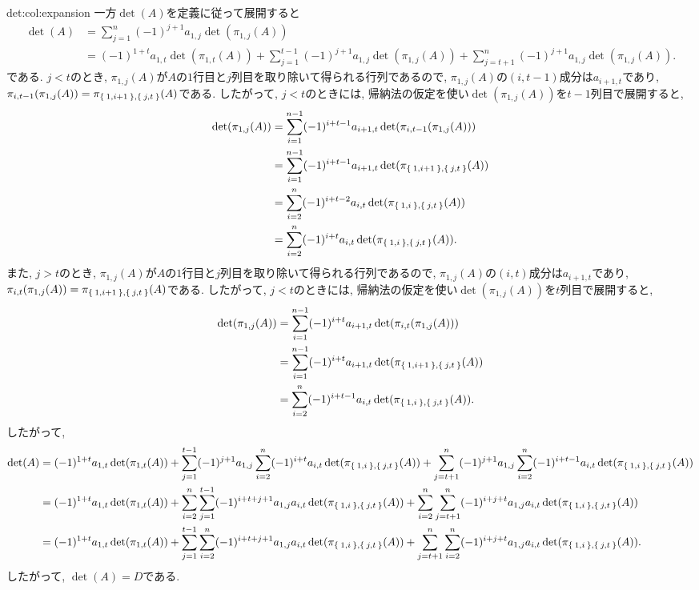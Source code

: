 \begin{proofof}{det:col:expansion}
  一方$\det(A)$を定義に従って展開すると
  \begin{align*}
    \det(A)
    &=\sum_{j=1}^{n}
      (-1)^{j+1}a_{1,j}\det(\pi_{1,j}(A))\\
    &=
    (-1)^{1+t}a_{1,t}\det(\pi_{1,t}(A))
    +\sum_{j=1}^{t-1}(-1)^{j+1}a_{1,j}\det(\pi_{1,j}(A))
    +\sum_{j=t+1}^{n}(-1)^{j+1}a_{1,j}\det(\pi_{1,j}(A)).
  \end{align*}
  である.
  $j<t$のとき,
  $\pi_{1,j}(A)$が$A$の$1$行目と$j$列目を取り除いて得られる行列であるので,
  $\pi_{1,j}(A)$の$(i,t-1)$成分は$a_{i+1,t}$であり,
  $\pi_{i,t-1}(\pi_{1,j}(A))=\pi_{\Set{1,i+1},\Set{j,t}}(A)$である.
  したがって, $j<t$のときには,
  帰納法の仮定を使い$\det(\pi_{1,j}(A))$を$t-1$列目で展開すると,
  \begin{align*}
    \det(\pi_{1,j}(A))
    &=
    \sum_{i=1}^{n-1}
    (-1)^{i+t-1}a_{i+1,t}\det(\pi_{i,t-1}(\pi_{1,j}(A)))\\
    &=
    \sum_{i=1}^{n-1}
    (-1)^{i+t-1}a_{i+1,t}\det(\pi_{\Set{1,i+1},\Set{j,t}}(A))\\
    &=
    \sum_{i=2}^{n}
    (-1)^{i+t-2}a_{i,t}\det(\pi_{\Set{1,i},\Set{j,t}}(A))\\
    &=
    \sum_{i=2}^{n}
    (-1)^{i+t}a_{i,t}\det(\pi_{\Set{1,i},\Set{j,t}}(A)).
  \end{align*}
  また,
  $j>t$のとき,
  $\pi_{1,j}(A)$が$A$の$1$行目と$j$列目を取り除いて得られる行列であるので,
  $\pi_{1,j}(A)$の$(i,t)$成分は$a_{i+1,t}$であり,
  $\pi_{i,t}(\pi_{1,j}(A))=\pi_{\Set{1,i+1},\Set{j,t}}(A)$である.
  したがって, $j<t$のときには,
  帰納法の仮定を使い$\det(\pi_{1,j}(A))$を$t$列目で展開すると,
  \begin{align*}
    \det(\pi_{1,j}(A))
    &=
    \sum_{i=1}^{n-1}
    (-1)^{i+t}a_{i+1,t}\det(\pi_{i,t}(\pi_{1,j}(A)))\\
    &=
    \sum_{i=1}^{n-1}
    (-1)^{i+t}a_{i+1,t}\det(\pi_{\Set{1,i+1},\Set{j,t}}(A))\\
    &=
    \sum_{i=2}^{n}
    (-1)^{i+t-1}a_{i,t}\det(\pi_{\Set{1,i},\Set{j,t}}(A)).
  \end{align*}  
  したがって,
  \begin{align*}
    \det(A)
    &=
    (-1)^{1+t}a_{1,t}\det(\pi_{1,t}(A))
    +\sum_{j=1}^{t-1}(-1)^{j+1}a_{1,j}
    \sum_{i=2}^{n}
    (-1)^{i+t}a_{i,t}\det(\pi_{\Set{1,i},\Set{j,t}}(A))
    +\sum_{j=t+1}^{n}(-1)^{j+1}a_{1,j}
    \sum_{i=2}^{n}
    (-1)^{i+t-1}a_{i,t}\det(\pi_{\Set{1,i},\Set{j,t}}(A))\\
    &=
    (-1)^{1+t}a_{1,t}\det(\pi_{1,t}(A))
    +
    \sum_{i=2}^{n}
    \sum_{j=1}^{t-1}
    (-1)^{i+t+j+1}a_{1,j}a_{i,t}\det(\pi_{\Set{1,i},\Set{j,t}}(A))    
    +
    \sum_{i=2}^{n}
    \sum_{j=t+1}^{n}
    (-1)^{i+j+t}a_{1,j}
    a_{i,t}\det(\pi_{\Set{1,i},\Set{j,t}}(A))\\
    &=
    (-1)^{1+t}a_{1,t}\det(\pi_{1,t}(A))
    +
    \sum_{j=1}^{t-1}
    \sum_{i=2}^{n}
    (-1)^{i+t+j+1}a_{1,j}a_{i,t}\det(\pi_{\Set{1,i},\Set{j,t}}(A))    
    +
    \sum_{j=t+1}^{n}
    \sum_{i=2}^{n}
    (-1)^{i+j+t}a_{1,j}
    a_{i,t}\det(\pi_{\Set{1,i},\Set{j,t}}(A)).
  \end{align*}
  したがって, $\det(A)=D$である.
\end{proofof}

